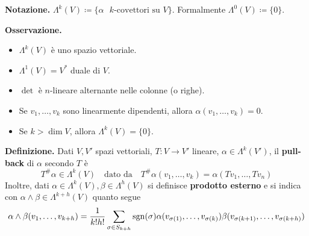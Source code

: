 \textbf{Notazione.} $\Lambda^k (V) \coloneqq  \{\alpha \text{ $k$-covettori su } V \}$. Formalmente $\Lambda^0(V) \coloneqq \{0\}$.

\textbf{Osservazione.} 
\begin{itemize}

	\item $\Lambda^k(V)$ è uno spazio vettoriale. 

	\item $\Lambda^1(V) = V^*$ duale di $V$.

	\item $\det$ è $n$-lineare alternante nelle colonne (o righe).

	\item Se $v_1,\ldots,v_k$ sono linearmente dipendenti, allora $\alpha(v_1,\ldots,v_k) = 0$.

	\item Se $k > \dim V$, allora $\Lambda^k(V) = \{0\}$.

\end{itemize}

\textbf{Definizione.} Dati $V,V'$ spazi vettoriali, $T \colon V \to V'$ lineare, $\alpha \in \Lambda^k (V')$, il \textbf{pull-back} di $\alpha$ secondo $T$ è
%
$$
T^\# \alpha \in \Lambda^k(V) \quad \text{dato da} \quad T^\# \alpha(v_1,\ldots,v_k) = \alpha(Tv_1,\ldots,Tv_n)
$$
%
Inoltre, dati $\alpha \in \Lambda^k(V), \beta \in \Lambda^h(V)$ si definisce \textbf{prodotto esterno} e si indica con $\alpha \wedge \beta \in \Lambda^{k+h}(V)$ quanto segue
%
$$
	\alpha \wedge \beta (v_1,\ldots,v_{k+h}) = \frac{1}{k!h!} \sum_{\sigma \in S_{k+h}} \operatorname{sgn} (\sigma) \alpha(v_{\sigma(1)},\ldots,v_{\sigma(k)}) \beta(v_{\sigma(k+1)},\ldots,v_{\sigma(k+h)})
$$
%
